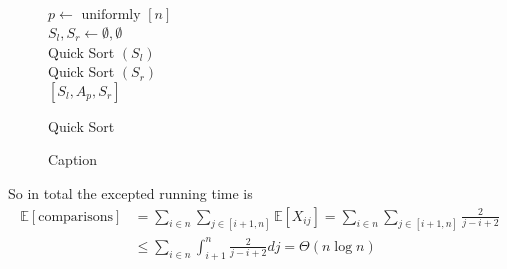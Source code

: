 \begin{figure}[h!]
    \centering
    \begin{algorithm}[H]
        \SetAlgoLined
        
        
         \(p \leftarrow \text{ uniformly } \left[n\right] \) \\
         \( S_{l} , S_{r} \leftarrow  \emptyset, \emptyset\)
         \ \\ 
        Quick Sort \( ( S_{l} ) \) \\
        Quick Sort \( ( S_{r} ) \)\\
        \Return \( [ S_{l}, A_{p}, S_{r} ]\)  
         \caption{Quick Sort}
    \end{algorithm}
    \caption{Caption}
    \label{fig:my_label2}
\end{figure}

So in total the excepted running time is 
\begin{equation*}
    \begin{split}
        \mathbb{E}\left[\text{comparisons}\right] &= \sum_{i\in n}{\sum_{j \in [i +1,n]}{\mathbb{E}[X_{ij}]}} = \sum_{i\in n}{\sum_{j \in [i +1,n]}{\frac{2}{j-i+2}}} \\ & \le \sum_{i\in n} \int_{i+1}^{n}{\frac{2}{j-i+2 }dj} = \Theta\left(n \log n\right)
    \end{split}
\end{equation*}



